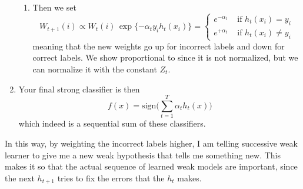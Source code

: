 \documentclass{article}
\begin{document}
\begin{definition}
\begin{enumerate}
\begin{enumerate}
                \item Then we set 
                  \begin{equation}
                    W_{t + 1} (i) \propto W_t (i) \, \exp\{ - \alpha_t y_i h_t (x_i) \} = \begin{cases} 
                      e^{-\alpha_t} & \text{ if } h_t(x_i) = y_i\\  
                      e^{+\alpha_t} & \text{ if } h_t (x_i) \neq y_i
                    \end{cases}
                  \end{equation}
                  meaning that the new weights go up for incorrect labels and down for correct labels. We show proportional to since it is not normalized, but we can normalize it with the constant $Z_t$. 
              \end{enumerate}

            \item Your final strong classifier is then 
              \begin{equation}
                f(x) = \mathrm{sign} \bigg( \sum_{t=1}^T \alpha_t h_t(x) \bigg)
              \end{equation}
              which indeed is a sequential sum of these classifiers. 
          \end{enumerate}
        \end{definition}

        In this way, by weighting the incorrect labels higher, I am telling successive weak learner to give me a new weak hypothesis that tells me something new. This makes it so that the actual sequence of learned weak models are important, since the next $h_{t+1}$ tries to fix the errors that the $h_t$ makes. 
\end{document}
